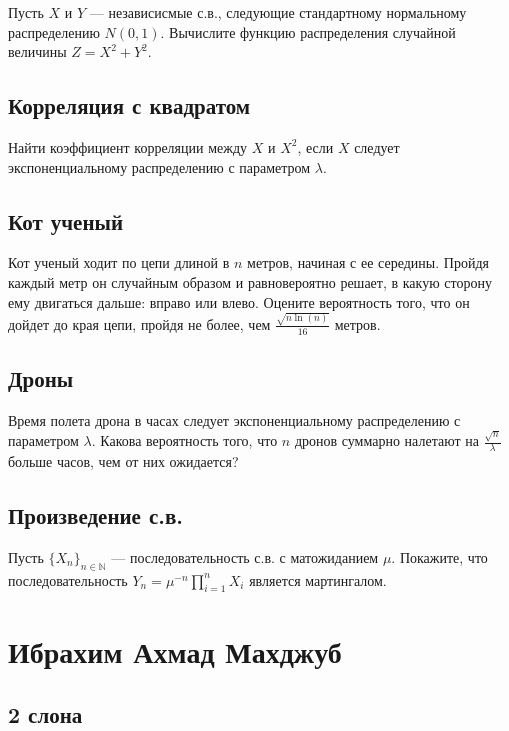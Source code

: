 \documentclass[12pt]{article}
\newcommand\N{\mathbb{N}}
\begin{document}
Пусть $X$ и $Y$ --- независисмые с.в., следующие стандартному нормальному распределению $N(0, 1)$. Вычислите функцию распределения случайной величины $Z = X^2 + Y^2$.



\subsection{Корреляция с квадратом}

Найти коэффициент корреляции между $X$ и $X^2$, если $X$ следует экспоненциальному распределению с параметром $\lambda$.



\subsection{Кот ученый}

Кот ученый ходит по цепи длиной в $n$ метров, начиная с ее середины. Пройдя каждый метр он случайным образом и равновероятно решает, в какую сторону ему двигаться дальше: вправо или влево. Оцените вероятность того, что он дойдет до края цепи, пройдя не более, чем $\frac{\sqrt{n \ln(n)}}{16}$ метров.



\subsection{Дроны}

Время полета дрона в часах следует экспоненциальному распределению с параметром $\lambda$. Какова вероятность того, что $n$ дронов суммарно налетают на $\frac{\sqrt{n}}{\lambda}$ больше часов, чем от них ожидается?



\subsection{Произведение с.в.}

Пусть $\{X_n\}_{n \in \N}$ --- последовательность с.в. с матожиданием $\mu$. Покажите, что последовательность $Y_n = \mu^{-n} \prod_{i = 1}^n X_i$ является мартингалом.



\newpage
\section{Ибрахим Ахмад Махджуб}

\subsection{2 слона}
\end{document}
